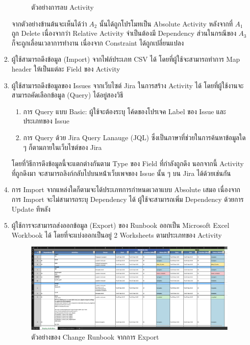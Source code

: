 \begin{enumerate}
\begin{figure} [H]
\begin{center}
        \end{center}
        \caption[ตัวอย่างการลบ Activity]{ตัวอย่างการลบ Activity}
        \label{fig:update activity example 5}
    \end{figure}
    จากตัวอย่างข้านต้นจะเห็นได้ว่า $A_2$ นั้นได้ถูกโปรโมทเป็น Absolute Activity หลังจากที่ $A_1$ ถูก Delete เนื่องจากว่า Relative Activity จำเป็นต้องมี Dependency ส่วนในกรณีของ $A_3$ ก็จะถูกเลื่อนเวลาการทำงาน เนื่องจาก Constraint ได้ถูกเปลี่ยนแปลง
    \item ผู้ใช้สามารถดึงข้อมูล (Import) จากไฟล์ประเภท CSV ได้ โดยที่ผู้ใช้จะสามารถทำการ Map header ให้เป็นแต่ละ Field ของ Activity
    \item ผู้ใช้สามารถดึงข้อมูลของ Issues จากเว็บไซต์ Jira ในการสร้าง​ Activity ได้ โดยที่ผู้ใช้งานจะสามารถคัดเลือกข้อมูล (Query) ได้อยู่สองวิธี
    \begin{enumerate}
        \item การ Query แบบ Basic: ผู้ใช้จะต้องระบุ โค้ดของโปรเจค Label ของ Issue และ ประเภทของ Issue
        \item การ Query ด้วย Jira Query Lanauge (JQL) ซึ่งเป็นภาษาที่ช่วยในการค้นหาข้อมูลใด ๆ ก็ตามภายในเว็บไซต์ของ Jira
    \end{enumerate}
    โดยที่วิธีการดึงข้อมูลนี้จะแตกต่างกันตาม Type ของ Field ที่กำลังถูกดึง นอกจากนี้ Activity ที่ถูกดึงมา จะสามารถลิงก์กลับไปบนหน้่าเว็บเพจของ Issue นั้น ๆ บน Jira ได้ด้วยเช่นกัน
    \item การ Import จากแหล่งใดก็ตามจะได้ประเภทการกำหนดเวลาแบบ Absolute เสมอ เนื่องจากการ Import จะไม่สามารถระบุ Dependency ได้ ผู้ใช้จะสามารถเพิ่ม Dependency ด้วยการ Update ทีหลัง
    \item ผู้ใช้การจะสามารถส่งออกข้อมูล (Export) ของ Runbook ออกเป็น Microsoft Excel Workbook ได้ โดยที่จะแบ่งออกเป็นอยู่ 2 Worksheets ตามประเภทของ Activity
    
    \begin{figure}[H]
        \begin{center}
            \includegraphics[scale=0.29]{resources/change-runbook-export.png}
        \end{center}
        \caption[ตัวอย่างของ Change Runbook จากการ Export]{ตัวอย่างของ Change Runbook จากการ Export}
        \label{fig:change-runbook-export}
    \end{figure}

\end{enumerate}


